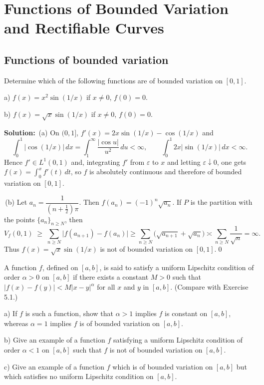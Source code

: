 \chapter{Functions of Bounded Variation and Rectifiable Curves}

\section{Functions of bounded variation}


\begin{problembox}
Determine which of the following functions are of bounded variation on $[0, 1]$.

a) $f(x) = x^2 \sin (1/x)$ if $x \neq 0$, $f(0) = 0$.

b) $f(x) = \sqrt{x} \sin (1/x)$ if $x \neq 0$, $f(0) = 0$.
\end{problembox}

\noindent\textbf{Solution:}
\,(a) On $(0,1]$, $f'(x)=2x\sin(1/x)-\cos(1/x)$ and
\[\int_0^1 |\cos(1/x)|\,dx=\int_1^{\infty}\frac{|\cos u|}{u^2}\,du<\infty,\qquad \int_0^1 2x|\sin(1/x)|\,dx<\infty.
\]
Hence $f'\in L^1(0,1)$ and, integrating $f'$ from $\varepsilon$ to $x$ and letting $\varepsilon\downarrow 0$, one gets $f(x)=\int_0^x f'(t)\,dt$, so $f$ is absolutely continuous and therefore of bounded variation on $[0,1]$.

\,(b) Let $a_n=\dfrac{1}{(n+\tfrac12)\pi}$. Then $f(a_n)=(-1)^n\sqrt{a_n}$. If $P$ is the partition with the points $\{a_n\}_{n\ge N}$, then
\[V_f(0,1)\;\ge\;\sum_{n\ge N}\big|f(a_{n+1})-f(a_n)\big|\ge \sum_{n\ge N}\big(\sqrt{a_{n+1}}+\sqrt{a_n}\big)\asymp\sum_{n\ge N}\frac{1}{\sqrt{n}}=\infty.
\]
Thus $f(x)=\sqrt{x}\sin(1/x)$ is not of bounded variation on $[0,1]$.\qed


\begin{problembox}
A function $f$, defined on $[a, b]$, is said to satisfy a uniform Lipschitz condition of order $\alpha > 0$ on $[a, b]$ if there exists a constant $M > 0$ such that $|f(x) - f(y)| < M |x - y|^\alpha$ for all $x$ and $y$ in $[a, b]$. (Compare with Exercise 5.1.)

a) If $f$ is such a function, show that $\alpha > 1$ implies $f$ is constant on $[a, b]$, whereas $\alpha = 1$ implies $f$ is of bounded variation on $[a, b]$.

b) Give an example of a function $f$ satisfying a uniform Lipschitz condition of order $\alpha < 1$ on $[a, b]$ such that $f$ is not of bounded variation on $[a, b]$.

c) Give an example of a function $f$ which is of bounded variation on $[a, b]$ but which satisfies no uniform Lipschitz condition on $[a, b]$.
\end{problembox}

